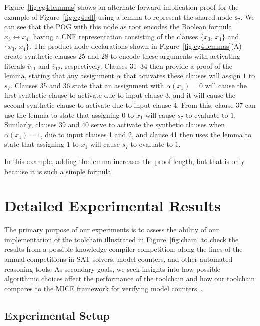 \documentclass[letterpaper,USenglish,cleveref, autoref, thm-restate]{lipics-v2021}
\newcommand{\obar}[1]{\overline{#1}}
\newcommand{\assign}{\alpha}
\newcommand{\makenode}[1]{\mathbf{#1}}
\newcommand{\nodes}{\makenode{s}}
\begin{document}
Figure~\ref{fig:eg4:lemmas} shows an alternate forward implication
proof for the example of Figure~\ref{fig:eg4:all} using a lemma to
represent the shared node $\nodes_7$.  We can see that the POG with
this node as root encodes the Boolean formula $x_3 \leftrightarrow x_4$, having a CNF representation consisting of the clauses
$\{x_3 ,\, \obar{x}_4\}$ and $\{\obar{x}_3 ,\, {x}_4\}$.  The product node
declarations shown in Figure~\ref{fig:eg4:lemmas}(A) create synthetic
clauses 25 and 28 to encode these arguments with activating literals
$\obar{v}_{11}$ and $\obar{v}_{12}$, respectively.  Clauses 31--34
then provide a proof of the lemma, stating that any assignment
$\assign$ that activates these clauses will  assign $1$ to $s_7$.
Clauses 35 and 36 state that an assignment with $\assign(x_1) = 0$
will cause the first synthetic clause to activate due to input clause
3, and it will cause the second synthetic clause to activate due to
input clause 4.  From this, clause 37 can use the lemma to state that
assigning $0$ to $x_1$ will cause $s_7$ to evaluate to $1$.  Similarly,
clauses 39 and 40 serve to activate the synthetic clauses when
$\assign(x_1) = 1$, due to input clauses 1 and 2, and clause 41 then
uses the lemma to state that assigning $1$ to $x_1$ will cause $s_7$ to
evaluate to $1$.

In this example, adding the lemma increases the proof length, but that
is only because it is such a simple formula.




\section{Detailed Experimental Results}
\label{app:experiments}

The primary purpose of our experiments is to assess the ability of our
implementation of the toolchain illustrated in Figure~\ref{fig:chain}
to check the results from a possible knowledge compiler competition,
along the lines of the annual competitions in SAT solvers, model
counters, and other automated reasoning tools.  As secondary goals, we
seek insights into how possible algorithmic choices affect the
performance of the toolchain and how our toolchain compares to the
MICE framework for verifying model counters~\cite{fichte:sat:2022}.

\subsection{Experimental Setup}
\end{document}

